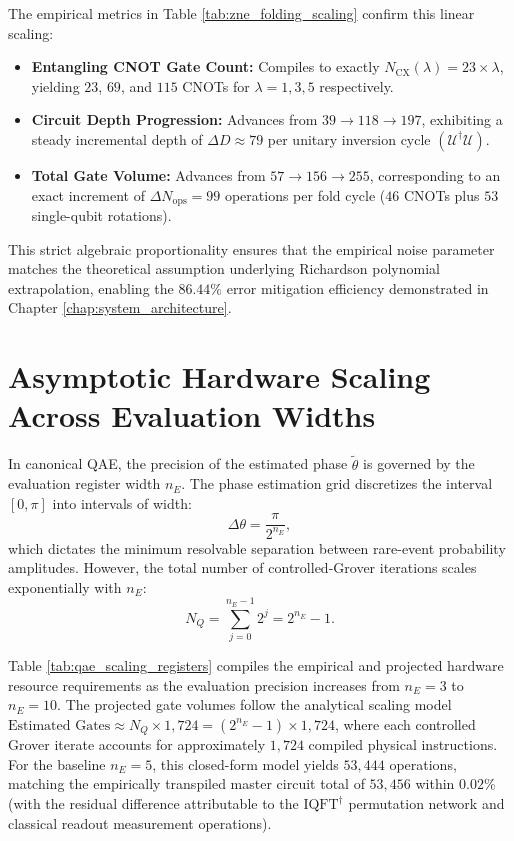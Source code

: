 The empirical metrics in Table \ref{tab:zne_folding_scaling} confirm this linear scaling:
\begin{itemize}[leftmargin=*]
    \item \textbf{Entangling CNOT Gate Count:} Compiles to exactly $N_{\mathrm{CX}}(\lambda) = 23 \times \lambda$, yielding $23$, $69$, and $115$ CNOTs for $\lambda = 1, 3, 5$ respectively.
    \item \textbf{Circuit Depth Progression:} Advances from $39 \to 118 \to 197$, exhibiting a steady incremental depth of $\Delta D \approx 79$ per unitary inversion cycle $(\mathcal{U}^\dagger \mathcal{U})$.
    \item \textbf{Total Gate Volume:} Advances from $57 \to 156 \to 255$, corresponding to an exact increment of $\Delta N_{\mathrm{ops}} = 99$ operations per fold cycle ($46$ CNOTs plus $53$ single-qubit rotations).
\end{itemize}
This strict algebraic proportionality ensures that the empirical noise parameter matches the theoretical assumption underlying Richardson polynomial extrapolation, enabling the $86.44\%$ error mitigation efficiency demonstrated in Chapter \ref{chap:system_architecture}.

\section{Asymptotic Hardware Scaling Across Evaluation Widths}\label{sec:app_scaling_analysis}

In canonical QAE, the precision of the estimated phase $\tilde{\theta}$ is governed by the evaluation register width $n_E$. The phase estimation grid discretizes the interval $[0, \pi]$ into intervals of width:
\begin{equation}
\Delta\theta = \frac{\pi}{2^{n_E}},
\end{equation}
which dictates the minimum resolvable separation between rare-event probability amplitudes. However, the total number of controlled-Grover iterations scales exponentially with $n_E$:
\begin{equation}
N_Q = \sum_{j=0}^{n_E - 1} 2^j = 2^{n_E} - 1.
\end{equation}

Table \ref{tab:qae_scaling_registers} compiles the empirical and projected hardware resource requirements as the evaluation precision increases from $n_E = 3$ to $n_E = 10$. The projected gate volumes follow the analytical scaling model $\text{Estimated Gates} \approx N_Q \times 1{,}724 = (2^{n_E} - 1) \times 1{,}724$, where each controlled Grover iterate accounts for approximately $1{,}724$ compiled physical instructions. For the baseline $n_E = 5$, this closed-form model yields $53{,}444$ operations, matching the empirically transpiled master circuit total of $53{,}456$ within $0.02\%$ (with the residual difference attributable to the $\mathrm{IQFT}^\dagger$ permutation network and classical readout measurement operations).

